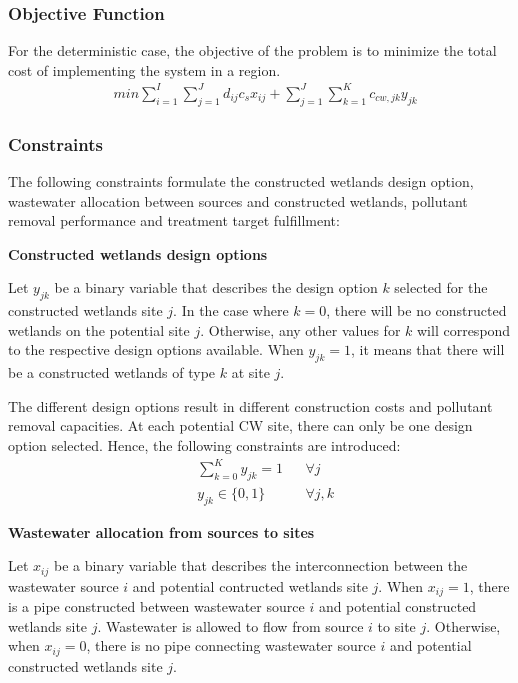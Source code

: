 \documentclass[preprint,12pt,authoryear]{elsarticle}
\begin{document}
\subsubsection{Objective Function}
For the deterministic case, the objective of the problem is to minimize the total cost of implementing the system in a region. 
\begin{align}
	&min \sum_{i=1}^I \sum_{j=1}^J d_{ij} c_s x_{ij} + \sum_{j=1}^J \sum_{k=1}^K c_{cw,jk} y_{jk}
\end{align}

\subsubsection{Constraints}
The following constraints formulate the constructed wetlands design option, wastewater allocation between sources and constructed wetlands, pollutant removal performance and treatment target fulfillment:

\noindent\textbf{Constructed wetlands design options} 

Let $y_{jk}$ be a binary variable that describes the design option $k$ selected for the constructed wetlands site $j$. In the case where $k=0$, there will be no constructed wetlands on the potential site $j$. Otherwise, any other values for $k$ will correspond to the respective design options available. When $y_{jk} = 1$, it means that there will be a constructed wetlands of type $k$ at site $j$. 

The different design options result in different construction costs and pollutant removal capacities. At each potential CW site, there can only be one design option selected. Hence, the following constraints are introduced:
\begin{align}
	&\sum_{k=0}^{K}y_{jk}=1&&\forall j\\
	&y_{jk}\in\{0,1\}&&\forall j,k
\end{align}

\noindent\textbf{Wastewater allocation from sources to sites} 

Let $x_{ij}$ be a binary variable that describes the interconnection between the wastewater source $i$ and potential contructed wetlands site $j$. When $x_{ij} = 1$, there is a pipe constructed between wastewater source $i$ and potential constructed wetlands site $j$. Wastewater is allowed to flow from source $i$ to site $j$. Otherwise, when $x_{ij} = 0$, there is no pipe connecting wastewater source $i$ and potential constructed wetlands site $j$. 
\end{document}
